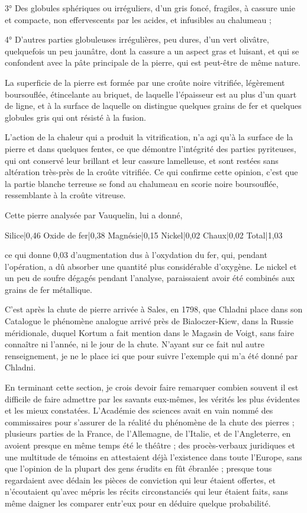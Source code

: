 \documentclass[a4paper, 12pt, oneside, french]{article}
\begin{document}
3° Des globules sphériques ou irréguliers, d'un gris foncé, fragiles, à cassure unie et compacte, non effervescents par les acides, et infusibles au chalumeau ;

4° D'autres parties globuleuses irrégulières, peu dures, d'un vert olivâtre, quelquefois un peu jaunâtre, dont la cassure a un aspect gras et luisant, et qui se confondent avec la pâte principale de la pierre, qui est peut-être de même nature.

La superficie de la pierre est formée par une croûte noire vitrifiée, légèrement boursouflée, étincelante au briquet, de laquelle l'épaisseur est au plus d'un quart de ligne, et à la surface de laquelle on distingue quelques grains de fer et quelques globules gris qui ont résisté à la fusion.

L'action de la chaleur qui a produit la vitrification, n'a agi qu'à la surface de la pierre et dans quelques fentes, ce que démontre l'intégrité des parties pyriteuses, qui ont conservé leur brillant et leur cassure lamelleuse, et sont restées sans altération très-près de la croûte vitrifiée. Ce qui confirme cette opinion, c'est que la partie blanche terreuse se fond au chalumeau en scorie noire boursouflée, ressemblante à la croûte vitreuse.

Cette pierre analysée par Vauquelin, lui a donné,

Silice|0,46  
Oxide de fer|0,38  
Magnésie|0,15  
Nickel|0,02  
Chaux|0,02  
Total|1,03

ce qui donne 0,03 d'augmentation dus à l'oxydation du fer, qui, pendant l'opération, a dû absorber une quantité plus considérable d'oxygène. Le nickel et un peu de soufre dégagés pendant l'analyse, paraissaient avoir été combinés aux grains de fer métallique.

C'est après la chute de pierre arrivée à Sales, en 1798, que Chladni place dans son Catalogue le phénomène analogue arrivé près de Bialoczer-Kiew, dans la Russie méridionale, duquel Kortum a fait mention dans le Magasin de Voigt, sans faire connaître ni l'année, ni le jour de la chute. N'ayant sur ce fait nul autre renseignement, je ne le place ici que pour suivre l'exemple qui m'a été donné par Chladni.

En terminant cette section, je crois devoir faire remarquer combien souvent il est difficile de faire admettre par les savants eux-mêmes, les vérités les plus évidentes et les mieux constatées. L'Académie des sciences avait en vain nommé des commissaires pour s'assurer de la réalité du phénomène de la chute des pierres ; plusieurs parties de la France, de l'Allemagne, de l'Italie, et de l'Angleterre, en avoient presque en même temps été le théâtre ; des procès-verbaux juridiques et une multitude de témoins en attestaient déjà l'existence dans toute l'Europe, sans que l'opinion de la plupart des gens érudits en fût ébranlée ; presque tous regardaient avec dédain les pièces de conviction qui leur étaient offertes, et n'écoutaient qu'avec mépris les récits circonstanciés qui leur étaient faits, sans même daigner les comparer entr'eux pour en déduire quelque probabilité.
\end{document}
